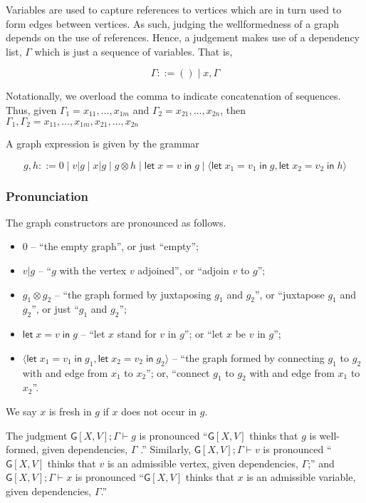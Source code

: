 \documentclass[12pt]{llncs}
\begin{document}
Variables are used to capture references to vertices which are in turn
used to form edges between vertices. As such, judging the wellformedness
of a graph depends on the use of references. Hence, a judgement makes
use of a dependency list, \(\Gamma\) which is just a sequence of
variables. That is,

\[\Gamma ::= () \;|\; x, \Gamma\]

Notationally, we overload the comma to indicate concatenation of
sequences. Thus, given \(\Gamma_1 = x_{11},\ldots,x_{1m}\) and
\(\Gamma_2 = x_{21},\ldots,x_{2n}\), then
\(\Gamma_1,\Gamma_2 = x_{11},\ldots,x_{1m},x_{21},\ldots,x_{2n}\)

A graph expression is given by the grammar

\[g,h ::= 0 \;|\; v|g \;|\; x|g \;|\; g \otimes h \; |\;\mathsf{let}\; x = v \; \mathsf{in}\; g \;|\; \langle \mathsf{let}\; x_1 = v_1 \; \mathsf{in}\; g, \mathsf{let}\; x_2 = v_2 \; \mathsf{in}\; h\rangle\]

\hypertarget{pronunciation}{%
\subsubsection{Pronunciation}\label{pronunciation}}

The graph constructors are pronounced as follows.

\begin{itemize}
\item
  \(0\) -- ``the empty graph'', or just ``empty'';
\item
  \(v | g\) -- ``\(g\) with the vertex \(v\) adjoined'', or ``adjoin
  \(v\) to \(g\)'';
\item
  \(g_1 \otimes g_2\) -- ``the graph formed by juxtaposing \(g_1\) and
  \(g_2\)'', or ``juxtapose \(g_1\) and \(g_2\)'', or just ``\(g_1\) and
  \(g_2\)'';
\item
  \(\mathsf{let}\; x = v \; \mathsf{in}\; g\) -- ``let \(x\) stand for
  \(v\) in \(g\)''; or ``let \(x\) be \(v\) in \(g\)'';
\item
  \(\langle \mathsf{let}\; x_1 = v_1 \; \mathsf{in}\; g_1,\mathsf{let}\; x_2 = v_2 \; \mathsf{in}\; g_2\rangle\)
  -- ``the graph formed by connecting \(g_1\) to \(g_2\) with and edge
  from \(x_1\) to \(x_2\)''; or, ``connect \(g_1\) to \(g_2\) with and
  edge from \(x_1\) to \(x_2\)''.
\end{itemize}

We say $x$ is fresh in $g$ if $x$ does not occur in $g$.

The judgment \(\mathsf{G}[X,V]; \Gamma \vdash g\) is pronounced
``\(\mathsf{G}[X,V]\) thinks that \(g\) is well-formed, given
dependencies, \(\Gamma\) .'' Similarly,
\(\mathsf{G}[X,V]; \Gamma \vdash v\) is pronounced ``\(\mathsf{G}[X,V]\)
thinks that \(v\) is an admissible vertex, given dependencies,
\(\Gamma\);'' and \(\mathsf{G}[X,V]; \Gamma \vdash x\) is pronounced
``\(\mathsf{G}[X,V]\) thinks that \(x\) is an admissible variable, given
dependencies, \(\Gamma\).''
\end{document}

